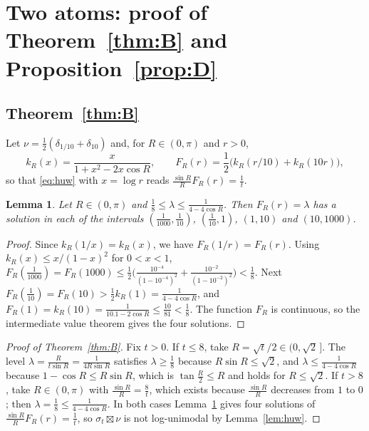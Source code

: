 \documentclass[11pt]{amsart}
\newtheorem{lemma}[theorem]{Lemma}
\theoremstyle{remark}
\begin{document}
\section{Two atoms: proof of \texorpdfstring{Theorem~\ref{thm:B} and Proposition~\ref{prop:D}}{Theorem B and Proposition D}}\label{sec:B}

\subsection{\texorpdfstring{Theorem~\ref{thm:B}}{Theorem B}}
Let $\nu=\frac12(\delta_{1/10}+\delta_{10})$ and, for $R\in(0,\pi)$ and $r>0$,
\[
k_R(x)=\frac{x}{1+x^2-2x\cos R},\qquad F_R(r)=\frac12\bigl(k_R(r/10)+k_R(10r)\bigr),
\]
so that \eqref{eq:huw} with $x=\log r$ reads $\frac{\sin R}{R}F_R(r)=\frac1t$.

\begin{lemma}\label{lem:window}
Let $R\in(0,\pi)$ and $\frac18\le\lambda\le\frac1{4-4\cos R}$. Then $F_R(r)=\lambda$ has a solution in each of the intervals $(\frac1{1000},\frac1{10})$, $(\frac1{10},1)$, $(1,10)$ and $(10,1000)$.
\end{lemma}

\begin{proof}
Since $k_R(1/x)=k_R(x)$, we have $F_R(1/r)=F_R(r)$. Using $k_R(x)\le x/(1-x)^2$ for $0<x<1$, $F_R(\frac1{1000})=F_R(1000)\le\frac12\bigl(\frac{10^{-4}}{(1-10^{-4})^2}+\frac{10^{-2}}{(1-10^{-2})^2}\bigr)<\frac18$. Next $F_R(\frac1{10})=F_R(10)>\frac12k_R(1)=\frac1{4-4\cos R}$, and $F_R(1)=k_R(10)=\frac{1}{10.1-2\cos R}\le\frac{10}{81}<\frac18$. The function $F_R$ is continuous, so the intermediate value theorem gives the four solutions.
\end{proof}

\begin{proof}[Proof of Theorem~\ref{thm:B}]
Fix $t>0$. If $t\le8$, take $R=\sqrt t/2\in(0,\sqrt2\,]$. The level $\lambda=\frac{R}{t\sin R}=\frac{1}{4R\sin R}$ satisfies $\lambda\ge\frac18$ because $R\sin R\le\sqrt2$, and $\lambda\le\frac1{4-4\cos R}$ because $1-\cos R\le R\sin R$, which is $\tan\frac R2\le R$ and holds for $R\le\sqrt2$. If $t>8$, take $R\in(0,\pi)$ with $\frac{\sin R}{R}=\frac8t$, which exists because $\frac{\sin R}R$ decreases from $1$ to $0$; then $\lambda=\frac18\le\frac1{4-4\cos R}$. In both cases Lemma~\ref{lem:window} gives four solutions of $\frac{\sin R}RF_R(r)=\frac1t$, so $\sigma_t\boxtimes\nu$ is not log-unimodal by Lemma~\ref{lem:huw}.
\end{proof}
\end{document}
